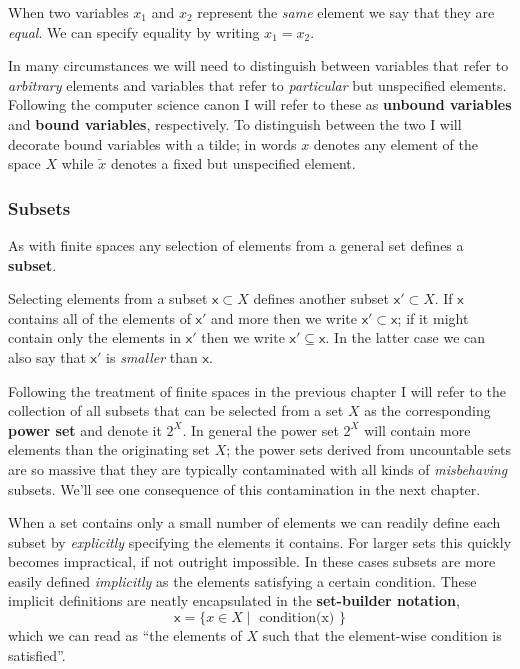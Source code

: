 \documentclass[
  letterpaper,
  DIV=11,
  numbers=noendperiod]{scrartcl}
\begin{document}
When two variables \(x_{1}\) and \(x_{2}\) represent the \emph{same}
element we say that they are \emph{equal}. We can specify equality by
writing \(x_{1} = x_{2}\).

In many circumstances we will need to distinguish between variables that
refer to \emph{arbitrary} elements and variables that refer to
\emph{particular} but unspecified elements. Following the computer
science canon I will refer to these as \textbf{unbound variables} and
\textbf{bound variables}, respectively. To distinguish between the two I
will decorate bound variables with a tilde; in words \(x\) denotes any
element of the space \(X\) while \(\tilde{x}\) denotes a fixed but
unspecified element.

\hypertarget{subsets}{%
\subsubsection{Subsets}\label{subsets}}

As with finite spaces any selection of elements from a general set
defines a \textbf{subset}.

Selecting elements from a subset \(\mathsf{x} \subset X\) defines
another subset \(\mathsf{x}' \subset X\). If \(\mathsf{x}\) contains all
of the elements of \(\mathsf{x}'\) and more then we write
\(\mathsf{x}' \subset \mathsf{x}\); if it might contain only the
elements in \(\mathsf{x}'\) then we write
\(\mathsf{x}' \subseteq \mathsf{x}\). In the latter case we can also say
that \(\mathsf{x}'\) is \emph{smaller} than \(\mathsf{x}\).

Following the treatment of finite spaces in the previous chapter I will
refer to the collection of all subsets that can be selected from a set
\(X\) as the corresponding \textbf{power set} and denote it \(2^X\). In
general the power set \(2^X\) will contain more elements than the
originating set \(X\); the power sets derived from uncountable sets are
so massive that they are typically contaminated with all kinds of
\emph{misbehaving} subsets. We'll see one consequence of this
contamination in the next chapter.

When a set contains only a small number of elements we can readily
define each subset by \emph{explicitly} specifying the elements it
contains. For larger sets this quickly becomes impractical, if not
outright impossible. In these cases subsets are more easily defined
\emph{implicitly} as the elements satisfying a certain condition. These
implicit definitions are neatly encapsulated in the \textbf{set-builder
notation}, \[
\mathsf{x} = \{ x \in X \mid \text{ condition(x) } \}
\] which we can read as ``the elements of \(X\) such that the
element-wise condition is satisfied''.
\end{document}
